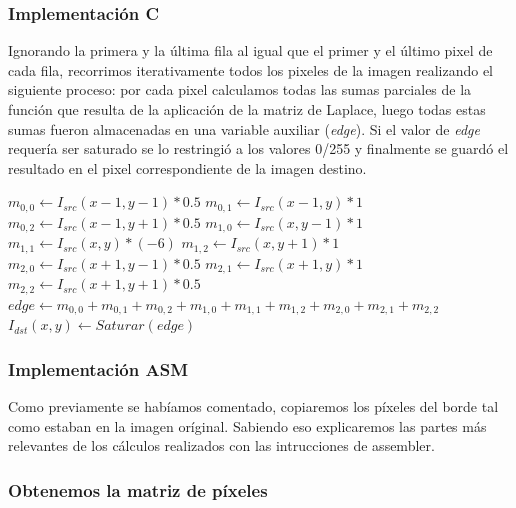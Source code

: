 \subsubsection{Implementación C}

Ignorando la primera y la última fila al igual que el primer y el último pixel de cada fila, recorrimos iterativamente todos los pixeles de la imagen realizando el siguiente proceso: por cada pixel calculamos todas las sumas parciales de la función que resulta de la aplicación de la matriz de Laplace, luego todas estas sumas fueron almacenadas en una variable auxiliar (\textit{edge}). Si el valor de \textit{edge} requería ser saturado se lo restringió a los valores 0/255 y finalmente se guardó el resultado en el pixel correspondiente de la imagen destino.

\begin{algorithm}[H]
  \begin{algorithmic}[1]
			  \STATE $m_{0,0} \gets I_{src}(x-1,y-1)*0.5$
			  \STATE $m_{0,1} \gets I_{src}(x-1,y)*1$
			  \STATE $m_{0,2} \gets I_{src}(x-1,y+1)*0.5$
			  \STATE $m_{1,0} \gets I_{src}(x,y-1)*1$
			  \STATE $m_{1,1} \gets I_{src}(x,y)*(-6)$
			  \STATE $m_{1,2} \gets I_{src}(x,y+1)*1$
			  \STATE $m_{2,0} \gets I_{src}(x+1,y-1)*0.5$
			  \STATE $m_{2,1} \gets I_{src}(x+1,y)*1$
			  \STATE $m_{2,2} \gets I_{src}(x+1,y+1)*0.5$
			  \STATE $edge \gets m_{0,0}+m_{0,1}+m_{0,2}+m_{1,0}+m_{1,1}+m_{1,2}+m_{2,0}+m_{2,1}+m_{2,2}$
			  \STATE $I_{dst}(x,y) \gets Saturar(edge)$
			\ENDFOR
		 \ENDFOR
  \end{algorithmic}
  \caption{$edge (I_{src}, I_{dst})$}
  \label{alg:edge}
\end{algorithm}

\subsubsection{Implementación ASM}

Como previamente se habíamos comentado, copiaremos los píxeles del borde tal como estaban en la imagen oríginal.
Sabiendo eso explicaremos las partes más relevantes de los cálculos realizados con las intrucciones de assembler.

\subsubsection*{Obtenemos la matriz de píxeles}

